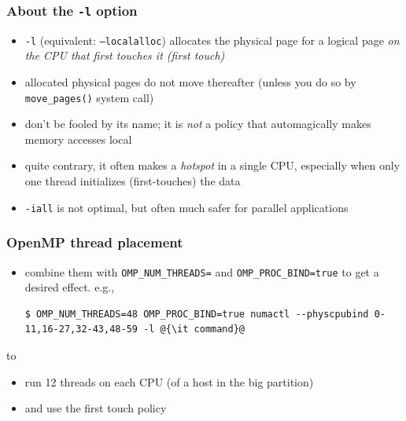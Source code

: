 \documentclass[12pt,dvipdfmx]{beamer}
\newcommand{\ao}[1]{{\color{blue}#1}}
\newcommand{\aka}[1]{{\color{red}#1}}
\begin{document}
\begin{frame}
\frametitle{About the {\tt -l} option}
\begin{itemize}
\item {\tt -l} (equivalent: {\tt --localalloc})
  allocates the physical page for a logical page
  \ao{\it on the CPU that first touches it (first touch)}
  
\item allocated physical pages do not move thereafter
  (unless you do so by {\tt move\_pages()} system call)

\item don't be fooled by its name;
  it is \aka{\it not} a policy that automagically
  makes memory accesses local

\item quite contrary, it often makes a \aka{\it hotspot} in a single CPU,
  especially when only one thread initializes (first-touches) the data

\item {\tt -iall} is not optimal, but often much safer
  for parallel applications
\end{itemize}
\end{frame}

\begin{frame}[fragile]
\frametitle{OpenMP thread placement}
\begin{itemize}
\item combine them with {\tt OMP\_NUM\_THREADS=}
  and {\tt OMP\_PROC\_BIND=true}
  to get a desired effect. e.g.,
\begin{lstlisting}
$ OMP_NUM_THREADS=48 OMP_PROC_BIND=true numactl --physcpubind 0-11,16-27,32-43,48-59 -l @{\it command}@
\end{lstlisting} %
\end{itemize}
to
\begin{itemize}
\item run 12 threads on each CPU (of a host in the big partition)
\item and use the first touch policy
\end{itemize}
\end{frame}
\end{document}
